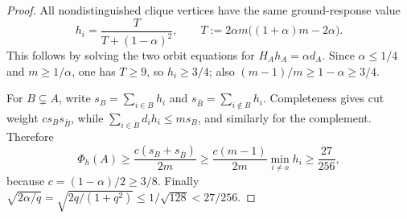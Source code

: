 \begin{proof}
All nondistinguished clique vertices have the same ground-response value
\begin{equation*}
 h_i=\frac{T}{T+(1-\alpha)^2},
 \qquad
 T:=2\alpha m\bigl((1+\alpha)m-2\alpha\bigr).
\end{equation*}
This follows by solving the two orbit equations for
\(H_Ah_A=\alpha d_A\).  Since \(\alpha\leq1/4\) and
\(m\geq1/\alpha\), one has \(T\geq9\), so \(h_i\geq3/4\);
also \((m-1)/m\geq1-\alpha\geq3/4\).

For \(B\subsetneq A\), write
\(s_B=\sum_{i\in B}h_i\) and \(s_{\bar B}=\sum_{i\notin B}h_i\).
Completeness gives cut weight \(c s_Bs_{\bar B}\), while
\(\sum_{i\in B}d_ih_i\leq m s_B\), and similarly for the complement.
Therefore
\begin{equation*}
 \Phi_h(A)
 \geq\frac{c(s_B+s_{\bar B})}{2m}
 \geq\frac{c(m-1)}{2m}\min_{i\neq o}h_i
 \geq\frac{27}{256},
\end{equation*}
because \(c=(1-\alpha)/2\geq3/8\).
Finally
\(\sqrt{2\alpha/q}=\sqrt{2q/(1+q^2)}
\leq1/\sqrt{128}<27/256\).
\end{proof}

